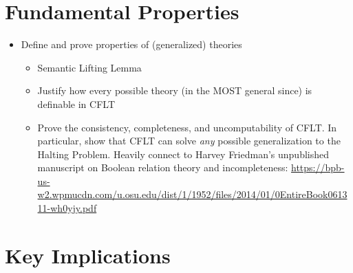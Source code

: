 \section{Fundamental Properties}
\begin{itemize}
  \item Define and prove properties of (generalized) theories
  \begin{itemize}
    \item Semantic Lifting Lemma
    \item Justify how every possible theory (in the MOST general since) is definable in CFLT
    \item Prove the consistency, completeness, and uncomputability of CFLT. In particular, show that CFLT can solve \textit{any} possible generalization to the Halting Problem. Heavily connect to Harvey Friedman's unpublished manuscript on Boolean relation theory and incompleteness: \url{https://bpb-us-w2.wpmucdn.com/u.osu.edu/dist/1/1952/files/2014/01/0EntireBook061311-wh0yjy.pdf} \end{itemize}
\end{itemize}

\section{Key Implications}
